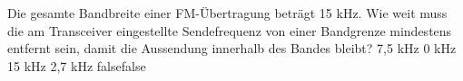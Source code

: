     {Die gesamte Bandbreite einer FM-Übertragung beträgt 15 kHz. Wie weit muss die am Transceiver eingestellte Sendefrequenz von einer Bandgrenze mindestens entfernt sein, damit die Aussendung innerhalb des Bandes bleibt?}
    {7,5 kHz}
    {0 kHz}
    {15 kHz}
    {2,7 kHz}
    {false}{false}